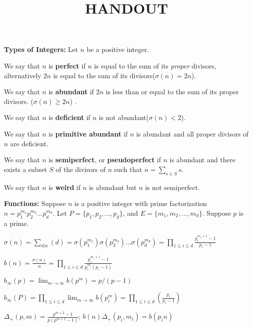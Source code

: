 \documentclass[12pt]{article}
\title{HANDOUT}
\begin{document}
\maketitle

\Large  
\textbf{Types of Integers: } Let $n$ be a positive integer.

We say that $n$ is \textbf{perfect} if $n$ is equal to the sum of its \textit{proper} divisors, alternatively  $2n$ is equal to the sum of its divisors($\sigma(n) = 2n$).
\vspace{-3mm}

We say that $n$ is \textbf{abundant} if $2n$ is less than or equal to the sum of its proper divisors. ($\sigma(n) \geq 2n$) .
\vspace{3mm}

We say that $n$ is \textbf{deficient} if $n$ is not abundant($\sigma(n) < 2$).
\vspace{3mm}

We say that $n$ is \textbf{primitive abundant} if $n$ is abundant and all proper divisors of $n$ are deficient.
\vspace{3mm}

We say that $n$ is \textbf{semiperfect}, or \textbf{pseudoperfect} if $n$ is abundant and there exists a subset $S$ of the divisors of $n$ such that $n = \sum_{s \in S} s$.
\vspace{3mm}

We say that $n$ is \textbf{weird} if $n$ is abundant but $n$ is not semiperfect. 

\textbf{Functions: } Suppose $n$ is a positive integer with prime 
factorization $n = p_1^{m_1} p_2^{m_2} ... p_d^{m_d}$.
Let $P = \{p_1, p_2, ..., p_d\}$, and $E = \{m_1, m_2, ..., m_d\}$. 
Suppose $p$ is a prime.
\vspace{3mm}

$\sigma(n) = \sum_{d | n}(d) =  
\sigma(p_1^{m_1}) \sigma(p_2^{m_2}) ... \sigma(p_d^{m_d}) = 
\prod_{1 \leq i \leq d} \frac{p_i^{m_i + 1} -1}{p_i -1}$
\vspace{3mm}

$b(n) = \frac{\sigma(n)}{n} = \prod_{1 \leq i \leq d} \frac{p_i^{m_i + 1} -1}{p_i^{m_i}(p_i -1)}$
\vspace{3mm}

$b_{\infty}(p) = \lim_{m \rightarrow \infty} b(p^m) = p / (p - 1)$
\vspace{3mm}

$  b_{\infty}(P) 
  = \prod_{1 \leq i \leq d} \lim_{m \rightarrow \infty}b(p_i^m)
                = \prod_{1 \leq i \leq d}(\frac{p_i}{p_i - 1})
$
\vspace{3mm}

$\Delta_+(p,m) = \frac{p^{m+2} - 1}{ p (p^{m + 1} -
1)}$; $ b(n) \Delta_+(p_i, m_i) = b(p_i n)$
\end{document}
